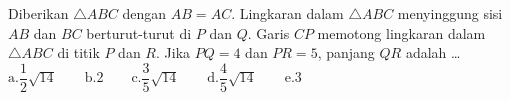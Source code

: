 Diberikan $\triangle ABC$ dengan $AB = AC$. Lingkaran dalam $\triangle ABC$ menyinggung sisi $AB$ dan $BC$ berturut-turut di $P$ dan $Q$. Garis $CP$ memotong lingkaran dalam $\triangle ABC$ di titik $P$ dan $R$. Jika $PQ = 4$ dan $PR = 5$, panjang $QR$ adalah \dots\\
$\text{a.} \dfrac{1}{2}\sqrt{14}\qquad
\text{b.}2\qquad
\text{c.}\dfrac{3}{5}\sqrt{14}\qquad
\text{d.}\dfrac{4}{5}\sqrt{14}\qquad
\text{e.}3$